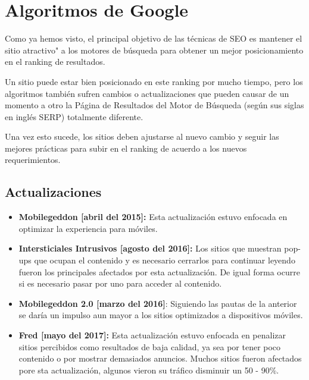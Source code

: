 \documentclass[12pt]{article}
\begin{document}
\section{Algoritmos de Google}

Como ya hemos visto, el principal objetivo de las técnicas de SEO es mantener el sitio atractivo" a los motores de búsqueda para obtener un mejor posicionamiento en el ranking de resultados.

Un sitio puede estar bien posicionado en este ranking por mucho tiempo, pero los algoritmos también sufren cambios o actualizaciones que pueden causar de un momento a otro la Página de Resultados del Motor de Búsqueda (según sus siglas en inglés SERP) totalmente diferente.

Una vez esto sucede, los sitios deben ajustarse al nuevo cambio y seguir las mejores prácticas para subir en el ranking de acuerdo a los nuevos requerimientos.

\subsection{Actualizaciones}

\begin{itemize}
\item \textbf{Mobilegeddon [abril del 2015]:} Esta actualización estuvo enfocada en optimizar la experiencia para móviles. \cite{mobilgeddon}

\item \textbf{Intersticiales Intrusivos [agosto del 2016]:} Los sitios que muestran pop-ups que ocupan el contenido y es necesario cerrarlos para continuar leyendo fueron los principales afectados por esta actualización. De igual forma ocurre si es necesario pasar por uno para acceder al contenido.

\item \textbf{Mobilegeddon 2.0 [marzo del 2016]}: Siguiendo las pautas de la anterior se daría un impulso aun mayor a los sitios optimizados a dispositivos móviles. \cite{mobilgeddon2}

\item \textbf{Fred [mayo del 2017]:} Esta actualización estuvo enfocada en penalizar sitios percibidos como resultados de baja calidad, ya sea por tener poco contenido o por mostrar demasiados anuncios. Muchos sitios fueron afectados pore sta actualización, algunos vieron su tráfico disminuir un 50 - 90\%. \cite{fred}

\end{itemize}

 

\end{document}

